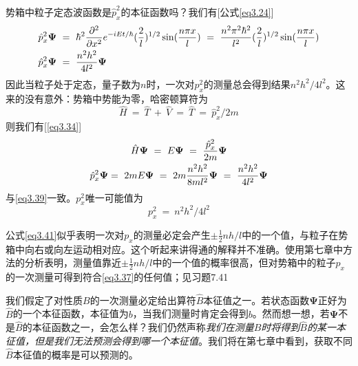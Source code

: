 \documentclass[12pt,a4paper,openany]{ctexbook}
\begin{document}
\begin{flushleft}
势箱中粒子定态波函数是$\hat{p}_x^2$的本征函数吗？我们有[公式\eqref{eq3.24}]
\begin{align}
    \hat{p}_x^2\bm{\Psi}\ &=\ \hbar^2\frac{\partial^2}{\partial x^2}e^{-iEt/\hbar}(\frac{2}{l})^{1/2}\sin(\frac{n\pi x}{l})\ =\ \frac{n^2\pi^2\hbar^2}{l^2}(\frac{2}{l})^{1/2}\sin(\frac{n\pi x}{l}) \notag \\
    \hat{p}_x^2\bm{\Psi}\ &=\ \frac{n^2h^2}{4l^2}\bm{\Psi} \label{eq3.39}
\end{align}
因此当粒子处于定态，量子数为$n$时，一次对$p_x^2$的测量总会得到结果$n^2h^2/4l^2$。这来的没有意外：势箱中势能为零，哈密顿算符为
\begin{equation*}
    \hat{H}\ =\ \hat{T}\ +\ \hat{V}\ =\ \hat{T}\ =\ \hat{p}_x^2/2m
\end{equation*}
则我们有[\eqref{eq3.34}]
\begin{gather}
    \hat{H}\bm{\Psi}\ =\ E\bm{\Psi}\ =\ \frac{\hat{p}_x^2}{2m}\bm{\Psi} \notag \\
    \hat{p}_x^2\bm{\Psi} =\ 2mE\bm{\Psi}\ =\ 2m\frac{n^2h^2}{8ml^2}\bm{\Psi}\ =\ \frac{n^2h^2}{4l^2}\bm{\Psi}
\end{gather}
与\eqref{eq3.39}一致。$p_x^2$唯一可能值为
\begin{equation}
    p_x^2\ =\ n^2h^2/4l^2 \label{eq3.41}
\end{equation}
\begin{center}
    \begin{minipage}{0.8\textwidth}
    \small
    公式\eqref{eq3.41}似乎表明一次对$p_x$的测量必定会产生$\pm\frac{1}{2}nh/l$中的一个值，与粒子在势箱中向右或向左运动相对应。这个听起来讲得通的解释并不准确。使用第七章中方法的分析表明，测量值靠近$\pm\frac{1}{2}nh/l$中的一个值的概率很高，但对势箱中的粒子$p_x$的一次测量可得到符合\eqref{eq3.37}的任何值；见习题7.41
    \end{minipage}
\end{center}

我们假定了对性质$B$的一次测量必定给出算符$\hat{B}$本征值之一。若状态函数$\bm{\Psi}$正好为$\hat{B}$的一个本征函数，本征值为$b$，当我们测量时肯定会得到$b$。然而想一想，若$\bm{\Psi}$不是$\hat{B}$的本征函数之一，会怎么样？我们仍然声称\textit{我们在测量$B$时将得到$\hat{B}$的某一本征值，但是我们无法预测会得到哪一个本征值}。我们将在第七章中看到，获取不同$\hat{B}$本征值的概率是可以预测的。


\end{flushleft}
\end{document}
